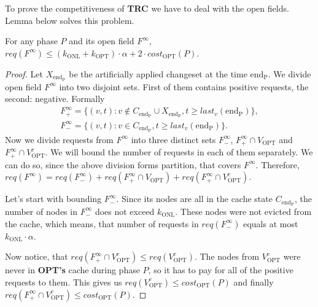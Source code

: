 
To prove the competitiveness of \textbf{TRC} we have to deal with the open
fields. Lemma below solves this problem.  \begin{lemma} For any phase $P$ and
its open field $F^{\infty}$, $req(F^{\infty}) \leq (k_{\mathrm{ONL}} +
k_{\mathrm{OPT}}) \cdot \alpha + 2 \cdot cost_{\mathrm{OPT}}(P)$.
\label{thm:inifinite_filed_bound} \end{lemma} \begin{proof} Let
$X_{\mathrm{end_P}}$ be the	artificially applied changeset at the time
$\mathrm{end_P}$. We divide open field $F^{\infty}$ into two disjoint sets.
First of them contains positive requests, the second: negative. Formally
\begin{gather*} F^{\infty}_{+} = \{(v, t): v \notin C_{\mathrm{end_P}} \cup
X_{\mathrm{end_P}}, t \geq last_v(\mathrm{end_P})\}, \\ F^{\infty}_{-} = \{(v,
t): v \in C_{\mathrm{end_P}}, t \geq last_v(\mathrm{end_P})\}.  \end{gather*}
Now we divide requests from $F^{\infty}$ into three distinct sets
$F^{\infty}_{-}$, $F^{\infty}_{+} \cap V_{\mathrm{OPT}}$ and $F^{\infty}_{+}
\cap V_{\mathrm{OPT}}^c$. We will bound the number of requests in each of them
separately. We can do so, since the above division forms partition, that covers
$F^{\infty}$. Therefore, $req(F^{\infty}) = req(F^{\infty}_{-}) +
req(F^{\infty}_{+} \cap V_{\mathrm{OPT}}) + req(F^{\infty}_{+} \cap
V_{\mathrm{OPT}}^c)$.

Let's start with bounding $F^{\infty}_{-}$. Since its nodes are all in the cache
state $C_{\mathrm{end_P}}$, the number of nodes in $F^{\infty}_{-}$ does not
exceed $k_{\mathrm{ONL}}$. These nodes were not evicted from the cache, which
means, that number of requests in $req(F^{\infty}_{-})$ equals at most
$k_{\mathrm{ONL}} \cdot \alpha$.

Now notice, that $req(F^{\infty}_{+} \cap V_{\mathrm{OPT}}^c) \leq
req(V_{\mathrm{OPT}}^c)$. The nodes from $V_{\mathrm{OPT}}^c$ were never in
\textbf{OPT's} cache during phase $P$, so it has to pay for all of the positive
requests to them. This gives us $req(V_{\mathrm{OPT}}^c) \leq
cost_{\mathrm{OPT}}(P)$ and finally $req(F^{\infty}_{+} \cap V_{\mathrm{OPT}}^c)
\leq cost_{\mathrm{OPT}}(P)$.


\end{proof}

